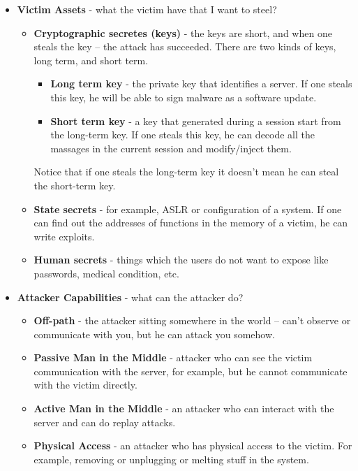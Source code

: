 \begin{itemize}
    \item \textbf{Victim Assets} - what the victim have that I want to steel? 
        \begin{itemize}
            \item \textbf{Cryptographic secretes (keys)} -  the keys are short, and when one steals the key – the attack has succeeded. There are two kinds of keys, long term, and short term.
                \begin{itemize}
                    \item \textbf{Long term key } - the private key that identifies a server. If one steals this key, he will be able to sign malware as a software update.
                    \item \textbf{Short term key} - a key that generated during a session start from the long-term key. If one steals this key, he can decode all the massages in the current session and modify/inject them.
                \end{itemize}
                Notice that if one steals the long-term key it doesn't mean he can steal the short-term key.
            \item \textbf{State secrets} - for example, ASLR or configuration of a system. If one can find out the addresses of functions in the memory of a victim, he can write exploits. 
            \item \textbf{Human secrets} - things which the users do not want to expose like passwords, medical condition, etc.
        \end{itemize}
    \item \textbf{Attacker Capabilities} - what can the attacker do?
        \begin{itemize}
            \item \textbf{Off-path} - the attacker sitting somewhere in the world – can't observe or communicate with you, but he can attack you somehow. 
            \item \textbf{Passive Man in the Middle} - attacker who can see the victim communication with the server, for example, but he cannot communicate with the victim directly.
            \item \textbf{Active Man in the Middle} - an attacker who can interact with the server and can do replay attacks.
            \item \textbf{Physical Access} - an attacker who has physical access to the victim. For example, removing or unplugging or melting stuff in the system.

\end{itemize}
\end{itemize}
